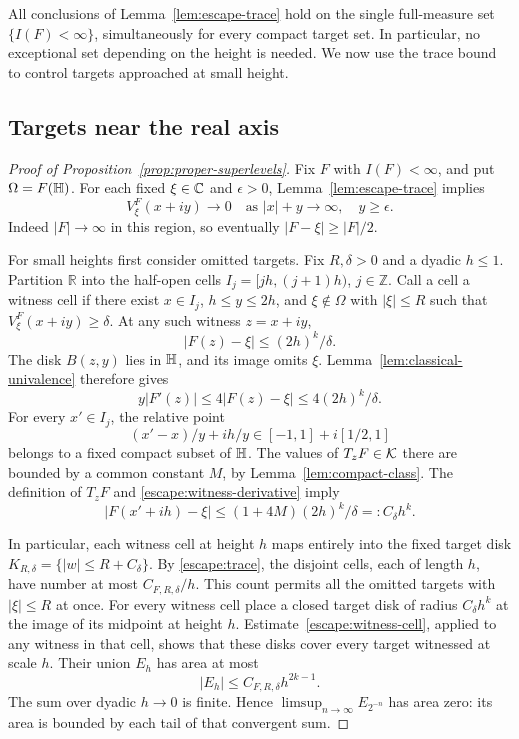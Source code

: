 All conclusions of Lemma~\ref{lem:escape-trace} hold on the single
full-measure set $\{I(F)<\infty\}$, simultaneously for every compact
target set.  In particular, no exceptional set depending on the height
is needed.  We now use the trace bound to control targets approached at
small height.

\subsection{Targets near the real axis}

\begin{proof}[Proof of Proposition~\ref{prop:proper-superlevels}]
Fix $F$ with $I(F)<\infty$, and put $\Omega=F(\mathbb H)$.
For each fixed $\xi\in\mathbb C$ and $\epsilon>0$, Lemma~\ref{lem:escape-trace}
implies
\begin{equation}
 V_\xi^F(x+iy)\longrightarrow0
 \quad\text{as }|x|+y\longrightarrow\infty,\quad y\ge\epsilon.
 \label{escape:target-tail}
\end{equation}
Indeed $|F|\to\infty$ in this region, so eventually
$|F-\xi|\ge|F|/2$.

For small heights first consider omitted targets.  Fix $R,\delta>0$ and
a dyadic $h\le1$.  Partition $\mathbb R$ into the half-open cells
$I_j=[jh,(j+1)h)$, $j\in\mathbb Z$.  Call a cell a witness cell if there
exist $x\in I_j$, $h\le y\le2h$, and
$\xi\notin\Omega$ with $|\xi|\le R$ such that
$V_\xi^F(x+iy)\ge\delta$.
At any such witness $z=x+iy$,
\[
 |F(z)-\xi|\le(2h)^k/\delta.
\]
The disk $B(z,y)$ lies in $\mathbb H$, and its image omits $\xi$.
Lemma~\ref{lem:classical-univalence} therefore gives
\begin{equation}
 y|F'(z)|\le4|F(z)-\xi|\le4(2h)^k/\delta.
 \label{escape:witness-derivative}
\end{equation}
For every $x'\in I_j$, the relative point
\[
 (x'-x)/y+i h/y
       \in[-1,1]+i[1/2,1]
\]
belongs to a fixed compact subset of $\mathbb H$.
The values of $T_zF\in\mathcal K$ there are bounded by a common constant $M$,
by Lemma~\ref{lem:compact-class}.  The definition of $T_zF$ and
\eqref{escape:witness-derivative} imply
\begin{equation}
 |F(x'+ih)-\xi|
 \le (1+4M)(2h)^k/\delta
 =:C_\delta h^k.
 \label{escape:witness-cell}
\end{equation}

In particular, each witness cell at height $h$ maps entirely into the
fixed target disk $K_{R,\delta}=\{|w|\le R+C_\delta\}$.
By \eqref{escape:trace}, the disjoint cells, each of length $h$, have
number at most $C_{F,R,\delta}/h$.  This count permits all the omitted
targets with $|\xi|\le R$ at once.
For every witness cell place a closed target disk of radius $C_\delta h^k$
at the image of its midpoint at height $h$.
Estimate~\eqref{escape:witness-cell}, applied to any witness in that
cell, shows that these disks cover every target witnessed at scale $h$.
Their union $E_h$ has area at most
\begin{equation}
 |E_h|\le C_{F,R,\delta}h^{2k-1}.
 \label{escape:target-cover}
\end{equation}
The sum over dyadic $h\to0$ is finite.  Hence
$\limsup_{n\to\infty}E_{2^{-n}}$ has area zero: its area is bounded by
each tail of that convergent sum.


\end{proof}
